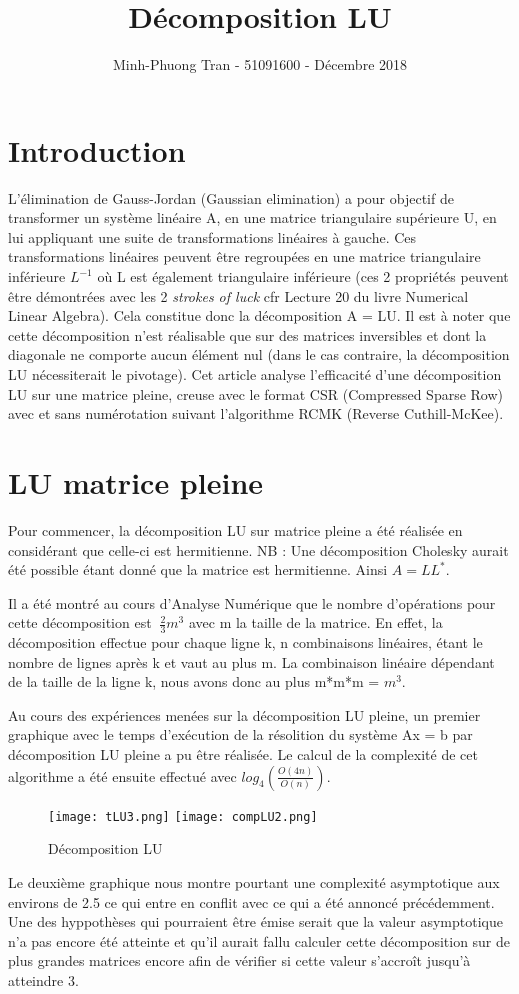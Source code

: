 \documentclass[11pt]{article}
\title{Décomposition LU}
\author{\small{Minh-Phuong Tran - 51091600 - Décembre 2018}}
\date{}
\begin{document}
\maketitle


\section{Introduction}
L'élimination de Gauss-Jordan (Gaussian elimination) a pour objectif de transformer un système linéaire A, en une matrice triangulaire supérieure U, en lui appliquant une suite de transformations linéaires à gauche. Ces transformations linéaires peuvent être regroupées en une matrice triangulaire inférieure $L^{-1}$ où L est également triangulaire inférieure (ces 2 propriétés peuvent être démontrées avec les 2 \textit{strokes of luck} cfr Lecture 20 du livre Numerical Linear Algebra). Cela constitue donc la décomposition A = LU. Il est à noter que cette décomposition n'est réalisable que sur des matrices inversibles et dont la diagonale ne comporte aucun élément nul (dans le cas contraire, la décomposition LU nécessiterait le pivotage). Cet article analyse l'efficacité d'une décomposition LU sur une matrice pleine, creuse avec le format CSR (Compressed Sparse Row) avec et sans numérotation suivant l'algorithme RCMK (Reverse Cuthill-McKee).

\section{LU matrice pleine}
Pour commencer, la décomposition LU sur matrice pleine a été réalisée en considérant que celle-ci est hermitienne.
NB : Une décomposition Cholesky aurait été possible étant donné que la matrice est hermitienne. Ainsi $A = L L^*$.

Il a été montré au cours d'Analyse Numérique que le nombre d'opérations pour cette décomposition est $~ \frac{2}{3}m^3$ avec m la taille de la matrice. En effet, la décomposition effectue pour chaque ligne k,  n combinaisons linéaires, étant le nombre de lignes après k et vaut au plus m. La combinaison linéaire dépendant de la taille de la ligne k, nous avons donc au plus m*m*m = $m^3$.

Au cours des expériences menées sur la décomposition LU pleine, un premier graphique avec le temps d'exécution de la résolition du système Ax = b par décomposition LU pleine a pu être réalisée. Le calcul de la complexité de cet algorithme a été ensuite effectué avec $log_4(\frac{O(4n)}{O(n)})$. 
\begin{figure}[h!]
    \centering
    \texttt{[image: tLU3.png]}
    \texttt{[image: compLU2.png]}
    \caption{Décomposition LU}
    \label{fig:my_label}
\end{figure}
Le deuxième graphique nous montre pourtant une complexité asymptotique aux environs de 2.5 ce qui entre en conflit avec ce qui a été annoncé précédemment. Une des hyppothèses qui pourraient être émise serait que la valeur asymptotique n'a pas encore été atteinte et qu'il aurait fallu calculer cette décomposition sur de plus grandes matrices encore afin de vérifier si cette valeur s'accroît jusqu'à atteindre 3.
\end{document}
